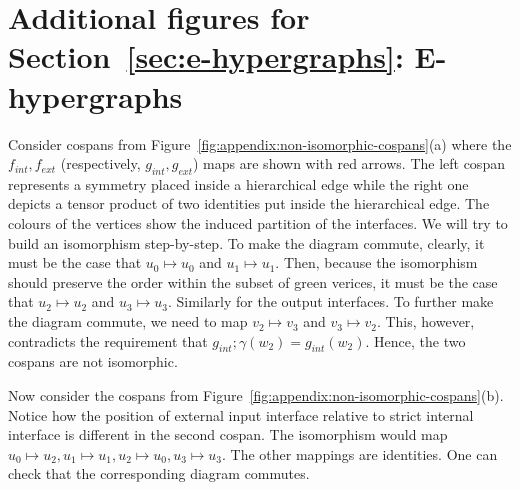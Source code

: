 \section{Additional figures for Section~\ref{sec:e-hypergraphs}: E-hypergraphs}
\begin{example}
    Consider cospans from Figure~\ref{fig:appendix:non-isomorphic-cospans}(a) where the $f_{int}, f_{ext}$ (respectively, $g_{int},g_{ext}$) maps are shown with red arrows.
    The left cospan represents a symmetry placed inside a hierarchical edge while the right one depicts a tensor product of two identities put inside the hierarchical edge.
    The colours of the vertices show the induced partition of the interfaces.
    We will try to build an isomorphism step-by-step.
    To make the diagram commute, clearly, it must be the case that $u_0 \mapsto u_0$ and $u_1 \mapsto u_1$.
    Then, because the isomorphism should preserve the order within the subset of green verices, it must be the case that $u_2 \mapsto u_2$ and $u_3 \mapsto u_3$.
    Similarly for the output interfaces.
    To further make the diagram commute, we need to map $v_2 \mapsto v_3$ and $v_3 \mapsto v_2$.
    This, however, contradicts the requirement that $g_{int};\gamma(w_2) = g_{int}(w_2)$.
    Hence, the two cospans are not isomorphic.
\end{example}

\begin{example}
    Now consider the cospans from Figure~\ref{fig:appendix:non-isomorphic-cospans}(b).
    Notice how the position of external input interface relative to strict internal interface is different in the second cospan.
    The isomorphism would map $u_0 \mapsto u_2, u_1 \mapsto u_1, u_2 \mapsto u_0, u_3 \mapsto u_3$.
    The other mappings are identities. 
    One can check that the corresponding diagram commutes.
\end{example}

